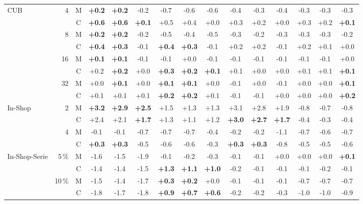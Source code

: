 \begin{table}[tbp]
\begin{tabular}{@{}l r c@{\hspace{4pt}} *{12}{S[table-format=+1.1, retain-explicit-plus]}@{}}
\addlinespace
\acs{CUB} & 4 & M & \bfseries +0.2 & \bfseries +0.2 & -0.2 & -0.7 & -0.6 & -0.6 & -0.4 & -0.3 & -0.4 & -0.3 & -0.3 & -0.3 \\
 &  & C & \bfseries +0.6 & \bfseries +0.6 & \bfseries +0.1 & +0.5 & +0.4 & +0.0 & +0.3 & +0.2 & +0.0 & +0.3 & +0.2 & \bfseries +0.1 \\
 & 8 & M & \bfseries +0.2 & \bfseries +0.2 & -0.2 & -0.5 & -0.4 & -0.5 & -0.3 & -0.2 & -0.3 & -0.3 & -0.3 & -0.2 \\
 &  & C & \bfseries +0.4 & \bfseries +0.3 & -0.1 & \bfseries +0.4 & \bfseries +0.3 & -0.1 & +0.2 & +0.2 & -0.1 & +0.2 & +0.1 & +0.0 \\
 & 16 & M & \bfseries +0.1 & \bfseries +0.1 & -0.1 & -0.1 & +0.0 & -0.1 & -0.1 & -0.1 & -0.1 & -0.1 & -0.1 & +0.0 \\
 &  & C & +0.2 & \bfseries +0.2 & +0.0 & \bfseries +0.3 & \bfseries +0.2 & \bfseries +0.1 & +0.1 & +0.0 & +0.0 & +0.1 & +0.1 & \bfseries +0.1 \\
 & 32 & M & +0.0 & \bfseries +0.1 & +0.0 & \bfseries +0.1 & \bfseries +0.1 & +0.0 & -0.1 & +0.0 & -0.1 & +0.0 & +0.0 & \bfseries +0.1 \\
 &  & C & +0.1 & +0.1 & +0.1 & \bfseries +0.2 & \bfseries +0.2 & +0.1 & -0.1 & -0.1 & +0.0 & +0.0 & +0.0 & \bfseries +0.2 \\
\addlinespace
In-Shop & 2 & M & \bfseries +3.2 & \bfseries +2.9 & \bfseries +2.5 & +1.5 & +1.3 & +1.3 & +3.1 & +2.8 & +1.9 & -0.8 & -0.7 & -0.8 \\
 &  & C & +2.4 & +2.1 & \bfseries +1.7 & +1.3 & +1.1 & +1.2 & \bfseries +3.0 & \bfseries +2.7 & \bfseries +1.7 & -0.4 & -0.3 & -0.4 \\
 & 4 & M & -0.1 & -0.1 & -0.7 & -0.7 & -0.7 & -0.4 & -0.2 & -0.2 & -1.1 & -0.7 & -0.6 & -0.7 \\
 &  & C & \bfseries +0.3 & \bfseries +0.3 & -0.5 & -0.6 & -0.6 & -0.3 & \bfseries +0.3 & \bfseries +0.3 & -0.8 & -0.5 & -0.5 & -0.6 \\
\addlinespace
In-Shop-Serie & 5\,\% & M & -1.6 & -1.5 & -1.9 & -0.1 & -0.2 & -0.3 & -0.1 & -0.1 & +0.0 & +0.0 & +0.0 & \bfseries +0.1 \\
 &  & C & -1.4 & -1.4 & -1.5 & \bfseries +1.3 & \bfseries +1.1 & \bfseries +1.0 & -0.2 & -0.1 & -0.1 & -0.1 & -0.2 & -0.1 \\
 & 10\,\% & M & -1.5 & -1.4 & -1.7 & \bfseries +0.3 & \bfseries +0.2 & +0.0 & -0.1 & -0.1 & -0.1 & -0.7 & -0.7 & -0.7 \\
 &  & C & -1.8 & -1.7 & -1.8 & \bfseries +0.9 & \bfseries +0.7 & \bfseries +0.6 & -0.2 & -0.2 & -0.3 & -1.0 & -1.0 & -0.9 \\

\end{tabular}
\end{table}

